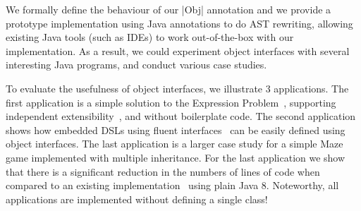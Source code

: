 %

We formally define the behaviour of our \Q|Obj| annotation and we provide a
prototype
implementation using Java annotations to do AST
rewriting, allowing existing Java tools (such as IDEs) to work
out-of-the-box with our implementation. As a result, we could
experiment object interfaces with several interesting Java programs,
and conduct various case studies.


To evaluate the usefulness of object interfaces, we illustrate 3
applications. The first application is a simple 
solution to the Expression Problem~\cite{wadler98expression}, supporting independent 
extensibility~\cite{zenger05independentlyextensible}, and without boilerplate code. The second
application shows how embedded DSLs using fluent interfaces~\cite{fowler2005fluentinterface} 
can be easily defined using object interfaces. The last
application is a larger case study for a simple Maze game implemented with 
multiple inheritance. For the last application we show that there is a
significant reduction in the numbers of lines of code when compared 
to an existing implementation~\cite{bono14} using plain Java 8. 
Noteworthy, all applications are implemented 
without defining a single class!

